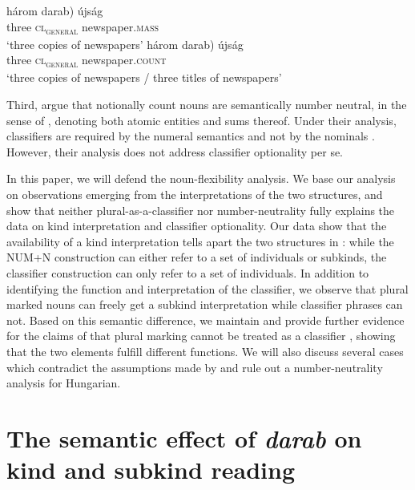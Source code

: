 \documentclass[output=paper]{langscibook}
\begin{document}
\ea \label{schv-nem:ex:7}
\ea \label{schv-nem:ex:7a}
\gll három \minsp{*(} darab) újság\\ %
three {} \textsc{cl\textsubscript{general}} newspaper.\textsc{mass}\\
\glt `three copies of newspapers' 
\ex \label{schv-nem:ex:7b}
\gll három  \minsp{(*} darab) újság\\ %
three {} \textsc{cl\textsubscript{general}}  newspaper.\textsc{count}\\
\glt `three copies of newspapers /  three titles of newspapers'
\z
\z

\noindent Third, \citet{erbach-etal-19} argue that notionally count nouns are semantically number neutral, in the sense of \citet{farkas-deswart-10}, denoting both atomic entities and sums thereof. Under their analysis, classifiers are required by the numeral semantics and not by the nominals \citep{krifka-95, sudo-17}. However, their analysis does not address classifier optionality per se.

In this paper, we will defend the noun-flexibility analysis. We base our analysis on observations emerging from the interpretations of the two structures, and show that neither plural-as-a-classifier nor number-neutrality fully explains the data on kind interpretation and classifier optionality.  Our data show that the availability of a kind interpretation tells apart the two structures in : while the NUM+N construction  can either refer to a set of individuals or subkinds, the classifier construction  can only refer to a set of individuals. In addition to identifying the function and interpretation of the classifier, we observe that plural marked nouns can freely get a subkind interpretation while classifier phrases can not. Based on this semantic difference, we maintain and provide further evidence for the claims of \citet{schvarcz-rothstein-17} that plural marking cannot be treated as a classifier \citep[contra][]{dekany-11}, showing that the two elements fulfill different functions.  We will also discuss several cases which contradict the assumptions made by  \citet{erbach-etal-19} and  rule out a number-neutrality analysis for Hungarian. 

\section{The semantic effect of \textit{darab} on kind and subkind reading} \label{schv-nem:sec:2}
\end{document}
